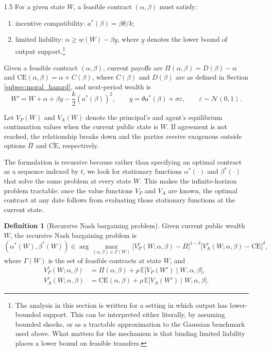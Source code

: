 \documentclass[12pt]{article}
\theoremstyle{definition}
\newtheorem{definition}{Definition}[section]
\theoremstyle{plain}
\begin{document}
\begin{spacing}{1.5}
For a given state $W$, a feasible contract $(\alpha,\beta)$ must satisfy:
\begin{enumerate}
    \item incentive compatibility: $a^*(\beta)=\beta\theta/k$;
    \item limited liability: $\alpha \geq \underline{w}(W)-\beta \underline y$, where $\underline y$ denotes the lower bound of output support.\footnote{The analysis in this section is written for a setting in which output has lower-bounded support. This can be interpreted either literally, by assuming bounded shocks, or as a tractable approximation to the Gaussian benchmark used above. What matters for the mechanism is that binding limited liability places a lower bound on feasible transfers.}
\end{enumerate}

Given a feasible contract $(\alpha,\beta)$, current payoffs are $\Pi(\alpha,\beta)=D(\beta)-\alpha$ and $\mathrm{CE}(\alpha,\beta)=\alpha+C(\beta)$, where $C(\beta)$ and $D(\beta)$ are as defined in Section \ref{subsec:moral_hazard}, and next-period wealth is
\[
W' = W+\alpha+\beta y-\frac{k}{2}(a^*(\beta))^2,\qquad y=\theta a^*(\beta)+\sigma \varepsilon,\qquad\varepsilon\sim \mathcal N(0,1).
\]

Let $V_P(W)$ and $V_A(W)$ denote the principal's and agent's equilibrium continuation values when the current public state is $W$. If agreement is not reached, the relationship breaks down and the parties receive exogenous outside options $\overline{\Pi}$ and $\overline{\text{CE}}$, respectively.

The formulation is recursive because rather than specifying an optimal contract as a sequence indexed by $t$, we look for stationary functions $\alpha^*(\cdot)$ and $\beta^*(\cdot)$ that solve the same problem at every state $W$. This makes the infinite-horizon problem tractable: once the value functions $V_P$ and $V_A$ are known, the optimal contract at any date follows from evaluating those stationary functions at the current state.

\begin{definition}[Recursive Nash bargaining problem]\label{def:recursive_nash}
Given current public wealth $W$, the recursive Nash bargaining problem is
\[
(\alpha^*(W),\beta^*(W))
\in
\arg\max_{(\alpha,\beta)\in\Gamma(W)}
\Big[V_P^{c}(W;\alpha,\beta)-\overline{\Pi}\Big]^{1-\delta}
\Big[V_A^{c}(W;\alpha,\beta)-\overline{\text{CE}}\Big]^{\delta},
\]
where $\Gamma(W)$ is the set of feasible contracts at state $W$, and
\begin{align*}
    V_P^{c}(W;\alpha,\beta)&=\Pi(\alpha,\beta)+\rho\,\mathbb E\big[V_P(W')\mid W,\alpha,\beta\big],\\
    V_A^{c}(W;\alpha,\beta)&=\mathrm{CE}(\alpha,\beta)+\rho\,\mathbb E\big[V_A(W')\mid W,\alpha,\beta\big].
\end{align*}
\end{definition}


\end{spacing}
\end{document}
